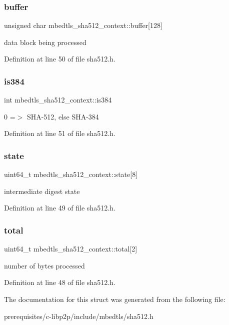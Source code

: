 \subsubsection{\texorpdfstring{buffer}{buffer}}
{\footnotesize\ttfamily unsigned char mbedtls\+\_\+sha512\+\_\+context\+::buffer\mbox{[}128\mbox{]}}

data block being processed 

Definition at line 50 of file sha512.\+h.

\mbox{\label{structmbedtls__sha512__context_a5061492d17d1a77471e61b0353db4e58}} 
\subsubsection{\texorpdfstring{is384}{is384}}
{\footnotesize\ttfamily int mbedtls\+\_\+sha512\+\_\+context\+::is384}

0 =$>$ S\+H\+A-\/512, else S\+H\+A-\/384 

Definition at line 51 of file sha512.\+h.

\mbox{\label{structmbedtls__sha512__context_a9c7c627cf1904c576244eaca0c5d7928}} 
\subsubsection{\texorpdfstring{state}{state}}
{\footnotesize\ttfamily uint64\+\_\+t mbedtls\+\_\+sha512\+\_\+context\+::state\mbox{[}8\mbox{]}}

intermediate digest state 

Definition at line 49 of file sha512.\+h.

\mbox{\label{structmbedtls__sha512__context_a0c0c3f28093d6107c549d235bcd50726}} 
\subsubsection{\texorpdfstring{total}{total}}
{\footnotesize\ttfamily uint64\+\_\+t mbedtls\+\_\+sha512\+\_\+context\+::total\mbox{[}2\mbox{]}}

number of bytes processed 

Definition at line 48 of file sha512.\+h.



The documentation for this struct was generated from the following file\+:\begin{DoxyCompactItemize}
\item 
prerequisites/c-\/libp2p/include/mbedtls/sha512.\+h\end{DoxyCompactItemize}
